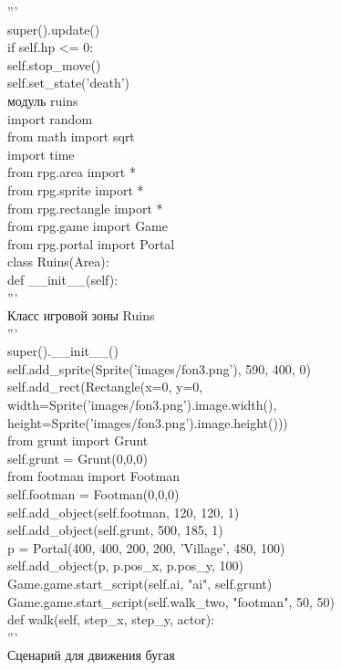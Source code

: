 '''\\
super().update()\\
if self.hp <= 0:\\
self.stop\_move()\\
self.set\_state('death')\\

модуль ruins\\
import random\\
from math import sqrt\\
import time\\
from rpg.area import *\\
from rpg.sprite import *\\
from rpg.rectangle import *\\
from rpg.game import Game\\
from rpg.portal import Portal\\

class Ruins(Area):\\
def \_\_init\_\_(self):\\
'''\\
Класс игровой зоны Ruins\\

'''\\
super().\_\_init\_\_()\\
self.add\_sprite(Sprite('images/fon3.png'), 590, 400, 0)\\
self.add\_rect(Rectangle(x=0, y=0, width=Sprite('images/fon3.png').image.width(), height=Sprite('images/fon3.png').image.height()))\\
from grunt import Grunt\\
self.grunt = Grunt(0,0,0)\\
from footman import Footman\\
self.footman = Footman(0,0,0)\\
self.add\_object(self.footman, 120, 120, 1)\\
self.add\_object(self.grunt, 500, 185, 1)\\
p = Portal(400, 400, 200, 200, 'Village', 480, 100)\\
self.add\_object(p, p.pos\_x, p.pos\_y, 100)\\
Game.game.start\_script(self.ai, "ai", self.grunt)\\
Game.game.start\_script(self.walk\_two, "footman", 50, 50)\\


def walk(self, step\_x, step\_y, actor):\\
'''\\
Сценарий для движения бугая\\

